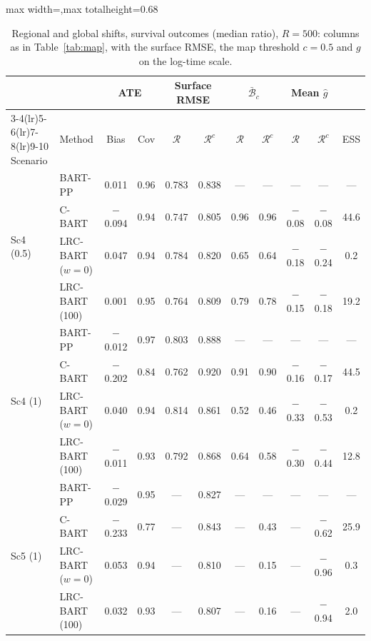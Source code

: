 \begin{table}[htbp]
\centering
\singlespacing
\caption{Regional and global shifts, survival outcomes (median ratio), $R=500$: columns as in Table~\ref{tab:map}, with the surface RMSE, the map threshold $c=0.5$ and $g$ on the log-time scale.}
\label{tab:map_surv}
\scriptsize
\setlength{\tabcolsep}{3pt}
\renewcommand{\arraystretch}{0.8}
\begin{adjustbox}{max width=\textwidth,max totalheight=0.68\textheight}
\begin{tabular}{llccccccccc}
\toprule
& & \multicolumn{2}{c}{ATE} & \multicolumn{2}{c}{Surface RMSE} & \multicolumn{2}{c}{$\bar{\mathcal B}_c$} & \multicolumn{2}{c}{Mean $\hat g$} & \\
\cmidrule(lr){3-4}\cmidrule(lr){5-6}\cmidrule(lr){7-8}\cmidrule(lr){9-10}
Scenario & Method & Bias & Cov & $\mathcal R$ & $\mathcal R^c$ & $\mathcal R$ & $\mathcal R^c$ & $\mathcal R$ & $\mathcal R^c$ & ESS \\
\midrule
\multirow{4}{*}{Sc4 (0.5)} & BART-PP & 0.011 & 0.96 & 0.783 & 0.838 & --- & --- & --- & --- & --- \\
& C-BART & $-$0.094 & 0.94 & 0.747 & 0.805 & 0.96 & 0.96 & $-$0.08 & $-$0.08 & 44.6 \\
& LRC-BART ($w=0$) & 0.047 & 0.94 & 0.784 & 0.820 & 0.65 & 0.64 & $-$0.18 & $-$0.24 & 0.2 \\
& LRC-BART (100) & 0.001 & 0.95 & 0.764 & 0.809 & 0.79 & 0.78 & $-$0.15 & $-$0.18 & 19.2 \\
\midrule
\multirow{4}{*}{Sc4 (1)} & BART-PP & $-$0.012 & 0.97 & 0.803 & 0.888 & --- & --- & --- & --- & --- \\
& C-BART & $-$0.202 & 0.84 & 0.762 & 0.920 & 0.91 & 0.90 & $-$0.16 & $-$0.17 & 44.5 \\
& LRC-BART ($w=0$) & 0.040 & 0.94 & 0.814 & 0.861 & 0.52 & 0.46 & $-$0.33 & $-$0.53 & 0.2 \\
& LRC-BART (100) & $-$0.011 & 0.93 & 0.792 & 0.868 & 0.64 & 0.58 & $-$0.30 & $-$0.44 & 12.8 \\
\midrule
\multirow{4}{*}{Sc5 (1)} & BART-PP & $-$0.029 & 0.95 & --- & 0.827 & --- & --- & --- & --- & --- \\
& C-BART & $-$0.233 & 0.77 & --- & 0.843 & --- & 0.43 & --- & $-$0.62 & 25.9 \\
& LRC-BART ($w=0$) & 0.053 & 0.94 & --- & 0.810 & --- & 0.15 & --- & $-$0.96 & 0.3 \\
& LRC-BART (100) & 0.032 & 0.93 & --- & 0.807 & --- & 0.16 & --- & $-$0.94 & 2.0 \\
\bottomrule
\end{tabular}
\end{adjustbox}
\end{table}
